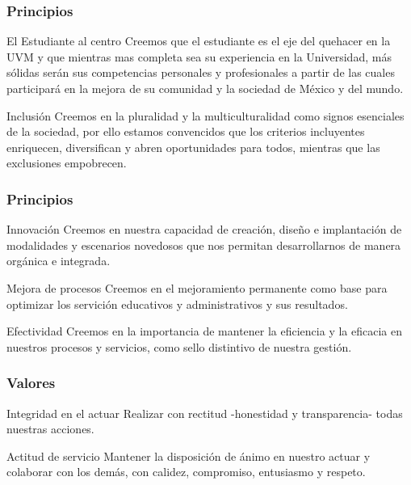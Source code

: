 \documentclass[handout]{beamer}
\begin{document}
\begin{frame}
  \frametitle{Principios}

  \begin{block}{El Estudiante al centro}
    Creemos que el estudiante es el eje del quehacer en la UVM y que mientras mas completa
    sea su experiencia en la Universidad, más sólidas serán sus competencias personales y
    profesionales a partir de las cuales participará en la mejora de su comunidad y la
    sociedad de México y del mundo.
  \end{block}

  \begin{block}{Inclusión}
    Creemos en la pluralidad y la multiculturalidad como signos esenciales de la sociedad,
    por ello estamos convencidos que los criterios incluyentes enriquecen, diversifican y
    abren oportunidades para todos, mientras que las exclusiones empobrecen.   
  \end{block}

\end{frame}

\begin{frame}  
  \frametitle{Principios}

  \begin{block}{Innovación}
    Creemos en nuestra capacidad de creación, diseño e implantación de modalidades y
    escenarios novedosos que nos permitan desarrollarnos de manera orgánica e integrada.
  \end{block}

  \begin{block}{Mejora de procesos}
    Creemos en el mejoramiento permanente como base para optimizar los servición
    educativos y administrativos y sus resultados.
  \end{block}

  \begin{block}{Efectividad}
    Creemos en la importancia de mantener la eficiencia y la eficacia en nuestros procesos
    y servicios, como sello distintivo de nuestra gestión.
  \end{block}
  
\end{frame}


\begin{frame}
  \frametitle{Valores}

  \begin{block}{Integridad en el actuar}
    Realizar con rectitud -honestidad y transparencia- todas nuestras acciones.    
  \end{block}

  \begin{block}{Actitud de servicio}
    Mantener la disposición de ánimo en nuestro actuar y colaborar con los demás, con
    calidez, compromiso, entusiasmo y respeto.
  \end{block}
\end{frame}
\end{document}
